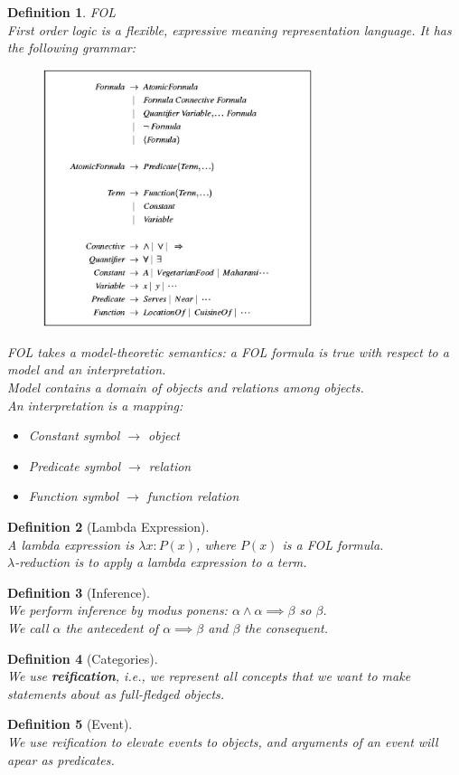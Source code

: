 \documentclass[12pt]{article}
\newtheorem{definition}{Definition}[section]
\theoremstyle{definition}
\begin{document}
\begin{definition}{FOL}
\hfill\\\normalfont First order logic is a flexible, expressive meaning representation language. It has the following grammar:
\begin{figure}[h]
\centering
\includegraphics[width=0.7\textwidth]{fol.jpg}
\end{figure}
FOL takes a model-theoretic semantics: a FOL formula is true with respect to a model and an interpretation.\\
Model contains a domain of objects and relations among objects.\\
An interpretation is a mapping:
\begin{itemize}
	\item Constant symbol $\to$ object
	\item Predicate symbol $\to$ relation
	\item Function symbol $\to$ function relation
\end{itemize}
\end{definition}
\begin{definition}[Lambda Expression]
\hfill\\\normalfont A lambda expression is $\lambda x: P(x)$, where $P(x)$ is a FOL formula.\\
$\lambda$-reduction is to apply a lambda expression to a term.
\end{definition} 
\begin{definition}[Inference]
\hfill\\\normalfont We perform inference by modus ponens: $\alpha \land \alpha \implies \beta$ so $\beta$.\\
We call $\alpha$ the antecedent of $\alpha\implies \beta$ and $\beta$ the consequent.
\end{definition}
\begin{definition}[Categories]
\hfill\\\normalfont We use \textbf{reification}, i.e., we represent all concepts that we want to make statements about as full-fledged objects.
\end{definition}
\begin{definition}[Event]
\hfill\\\normalfont We use reification to elevate events to objects, and arguments of an event will apear as predicates.
\end{definition}
\clearpage
\end{document}
